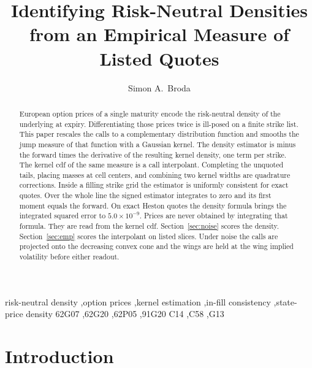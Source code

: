 \documentclass[preprint,12pt,authoryear,times]{elsarticle}
\begin{document}
\begin{frontmatter}

\title{Identifying Risk-Neutral Densities from an Empirical Measure of Listed Quotes}

\author[ifz]{Simon A.\ Broda}

\begin{abstract}
European option prices of a single maturity encode the risk-neutral density of the underlying at expiry. Differentiating those prices twice is ill-posed on a finite strike list. This paper rescales the calls to a complementary distribution function and smooths the jump measure of that function with a Gaussian kernel. The density estimator is minus the forward times the derivative of the resulting kernel density, one term per strike. The kernel cdf of the same measure is a call interpolant. Completing the unquoted tails, placing masses at cell centers, and combining two kernel widths are quadrature corrections. Inside a filling strike grid the estimator is uniformly consistent for exact quotes. Over the whole line the signed estimator integrates to zero and its first moment equals the forward. On exact Heston quotes the density formula brings the integrated squared error to \(5.0\times 10^{-9}\). Prices are never obtained by integrating that formula. They are read from the kernel cdf. Section~\ref{sec:noise} scores the density. Section~\ref{sec:emp} scores the interpolant on listed slices. Under noise the calls are projected onto the decreasing convex cone and the wings are held at the wing implied volatility before either readout.
\end{abstract}

\begin{keyword}
risk-neutral density \sep option prices \sep kernel estimation \sep in-fill consistency \sep state-price density
\MSC[2010] 62G07 \sep 62G20 \sep 62P05 \sep 91G20
\JEL C14 \sep C58 \sep G13
\end{keyword}

\end{frontmatter}

\section{Introduction}
\label{sec:intro}
\end{document}
